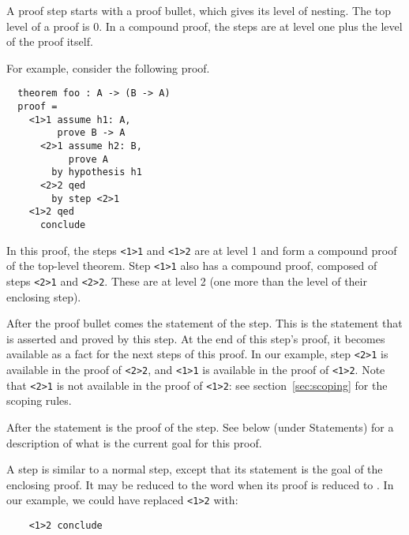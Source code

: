 A proof step starts with a proof bullet, which gives its level of
nesting.  The top level of a proof is 0.  In a compound proof, the
steps are at level one plus the level of the proof itself.

\goodbreak
For example, consider the following proof.

\begin{verbatim}
  theorem foo : A -> (B -> A)
  proof =
    <1>1 assume h1: A,
         prove B -> A
      <2>1 assume h2: B,
           prove A
        by hypothesis h1
      <2>2 qed
        by step <2>1
    <1>2 qed
      conclude
\end{verbatim}

In this proof, the steps \verb"<1>1" and \verb"<1>2" are at level 1
and form a compound proof of the top-level theorem.  Step \verb"<1>1"
also has a compound proof, composed of steps \verb"<2>1"
and \verb"<2>2".  These are at level 2 (one more than the level of
their enclosing step).

After the proof bullet comes the statement of the step.  This is the
statement that is asserted and proved by this step.  At the end of
this step's proof, it becomes available as a fact for the next steps
of this proof.  In our example, step \verb"<2>1" is available in the
proof of \verb"<2>2", and \verb"<1>1" is available in the proof of
\verb"<1>2".  Note that \verb"<2>1" is not available in the proof of
\verb"<1>2": see section~\ref{sec:scoping} for the scoping rules.

After the statement is the proof of the step.  See below (under
Statements) for a description of what is the current goal for this
proof.

\begin{syn}
 \is
      
\alt{} 
\end{syn}


A  step is similar to a normal step, except that its
statement is the goal of the enclosing proof.  It may be reduced to
the word  when its proof is reduced to
.  In our example, we could have replaced
\verb"<1>2" with:
\begin{verbatim}
    <1>2 conclude
\end{verbatim}

